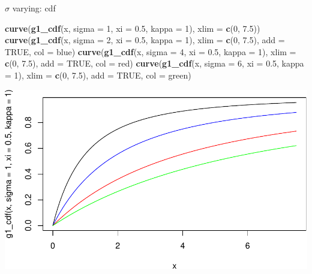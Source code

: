 \documentclass[
]{article}
\newenvironment{Shaded}{\begin{snugshade}}{\end{snugshade}}
\newcommand{\AttributeTok}[1]{\textcolor[rgb]{0.13,0.29,0.53}{#1}}
\newcommand{\ConstantTok}[1]{\textcolor[rgb]{0.56,0.35,0.01}{#1}}
\newcommand{\DecValTok}[1]{\textcolor[rgb]{0.00,0.00,0.81}{#1}}
\newcommand{\FloatTok}[1]{\textcolor[rgb]{0.00,0.00,0.81}{#1}}
\newcommand{\FunctionTok}[1]{\textcolor[rgb]{0.13,0.29,0.53}{\textbf{#1}}}
\newcommand{\NormalTok}[1]{#1}
\newcommand{\StringTok}[1]{\textcolor[rgb]{0.31,0.60,0.02}{#1}}
\begin{document}
\(\sigma\) varying: cdf

\begin{Shaded}
\begin{Highlighting}[]
\FunctionTok{curve}\NormalTok{(}\FunctionTok{g1\_cdf}\NormalTok{(x, }\AttributeTok{sigma =} \DecValTok{1}\NormalTok{, }\AttributeTok{xi =} \FloatTok{0.5}\NormalTok{, }\AttributeTok{kappa =} \DecValTok{1}\NormalTok{), }\AttributeTok{xlim =} \FunctionTok{c}\NormalTok{(}\DecValTok{0}\NormalTok{, }\FloatTok{7.5}\NormalTok{))}
\FunctionTok{curve}\NormalTok{(}\FunctionTok{g1\_cdf}\NormalTok{(x, }\AttributeTok{sigma =} \DecValTok{2}\NormalTok{, }\AttributeTok{xi =} \FloatTok{0.5}\NormalTok{, }\AttributeTok{kappa =} \DecValTok{1}\NormalTok{), }\AttributeTok{xlim =} \FunctionTok{c}\NormalTok{(}\DecValTok{0}\NormalTok{, }\FloatTok{7.5}\NormalTok{), }\AttributeTok{add =} \ConstantTok{TRUE}\NormalTok{, }\AttributeTok{col =} \StringTok{\textquotesingle{}blue\textquotesingle{}}\NormalTok{)}
\FunctionTok{curve}\NormalTok{(}\FunctionTok{g1\_cdf}\NormalTok{(x, }\AttributeTok{sigma =} \DecValTok{4}\NormalTok{, }\AttributeTok{xi =} \FloatTok{0.5}\NormalTok{, }\AttributeTok{kappa =} \DecValTok{1}\NormalTok{), }\AttributeTok{xlim =} \FunctionTok{c}\NormalTok{(}\DecValTok{0}\NormalTok{, }\FloatTok{7.5}\NormalTok{), }\AttributeTok{add =} \ConstantTok{TRUE}\NormalTok{, }\AttributeTok{col =} \StringTok{\textquotesingle{}red\textquotesingle{}}\NormalTok{)}
\FunctionTok{curve}\NormalTok{(}\FunctionTok{g1\_cdf}\NormalTok{(x, }\AttributeTok{sigma =} \DecValTok{6}\NormalTok{, }\AttributeTok{xi =} \FloatTok{0.5}\NormalTok{, }\AttributeTok{kappa =} \DecValTok{1}\NormalTok{), }\AttributeTok{xlim =} \FunctionTok{c}\NormalTok{(}\DecValTok{0}\NormalTok{, }\FloatTok{7.5}\NormalTok{), }\AttributeTok{add =} \ConstantTok{TRUE}\NormalTok{, }\AttributeTok{col =} \StringTok{\textquotesingle{}green\textquotesingle{}}\NormalTok{)}
\end{Highlighting}
\end{Shaded}

\begin{center}\includegraphics[width=0.8\linewidth]{g1_varying_params_files/figure-latex/unnamed-chunk-5-1} \end{center}
\pagebreak
\end{document}
